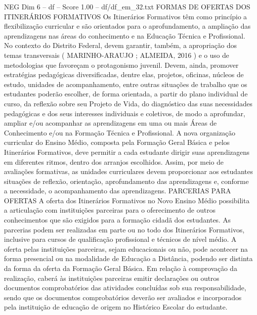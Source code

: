 \begin{textsample}{NEG Dim 6 – df – Score 1.00 – df/df\_em\_32.txt}  \label{ex:f6_neg_167}
FORMAS DE OFERTAS DOS ITINERÁRIOS FORMATIVOS Os Itinerários Formativos têm como princípio a flexibilização curricular e são orientados para o aprofundamento, a ampliação das aprendizagens nas áreas do conhecimento e na Educação Técnica e Profissional.
No contexto do Distrito Federal, devem garantir, também, a apropriação dos temas transversais ( MARINHO-ARAUJO ; ALMEIDA, 2016 ) e o uso de metodologias que favoreçam o protagonismo juvenil.
Devem, ainda, promover estratégias pedagógicas diversificadas, dentre elas, projetos, oficinas, núcleos de estudo, unidades de acompanhamento, entre outras situações de trabalho que os estudantes poderão escolher, de forma orientada, a partir do plano individual de curso, da reflexão sobre seu Projeto de Vida, do diagnóstico das suas necessidades pedagógicas e dos seus interesses individuais e coletivos, de modo a aprofundar, ampliar e/ou acompanhar as aprendizagens em uma ou mais Áreas de Conhecimento e/ou na Formação Técnica e Profissional.
A nova organização curricular do Ensino Médio, composta pela Formação Geral Básica e pelos Itinerários Formativos, deve permitir a cada estudante dirigir suas aprendizagens em diferentes ritmos, dentro dos arranjos escolhidos.
Assim, por meio de avaliações formativas, as unidades curriculares devem proporcionar aos estudantes situações de reflexão, orientação, aprofundamento das aprendizagens e, conforme a necessidade, o acompanhamento das aprendizagens.
PARCERIAS PARA OFERTAS A oferta dos Itinerários Formativos no Novo Ensino Médio possibilita a articulação com instituições parceiras para o oferecimento de outros conhecimentos que são exigidos para a formação cidadã dos estudantes.
As parcerias podem ser realizadas em parte ou no todo dos Itinerários Formativos, inclusive para cursos de qualificação profissional e técnicos de nível médio.
A oferta pelas instituições parceiras, sejam educacionais ou não, pode acontecer na forma presencial ou na modalidade de Educação a Distância, podendo ser distinta da forma da oferta da Formação Geral Básica.
Em relação à comprovação da realização, caberá às instituições parceiras emitir declarações ou outros documentos comprobatórios das atividades concluídas sob sua responsabilidade, sendo que os documentos comprobatórios deverão ser avaliados e incorporados pela instituição de educação de origem no Histórico Escolar do estudante.

\end{textsample}

